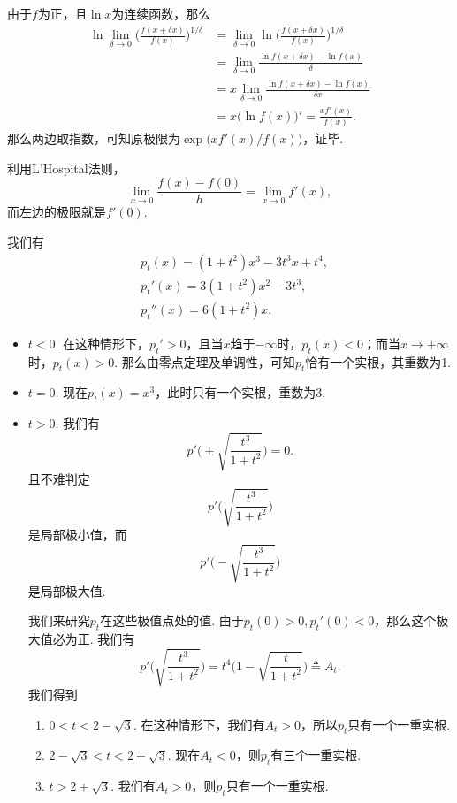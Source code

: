 \begin{ans}
  由于$f$为正，且$\ln x$为连续函数，那么
  \begin{align*}
    \ln\lim_{\delta\to0}\Big( \frac{f(x+\delta x)}{f(x)} \Big)^{1/\delta} & = \lim_{\delta\to0}\ln
    \Big( \frac{f(x+\delta x)}{f(x)} \Big)^{1/\delta}\\
    & = \lim_{\delta\to0}\frac{\ln f(x+\delta x)-\ln f(x)}
       \delta\\
    & = x \lim_{\delta\to0}\frac{\ln f(x+\delta x)-\ln f(x)}
       {\delta x}\\
    & = x \big(\ln f(x) \big)'=\frac{xf'(x)}{f(x)}.
  \end{align*}
  那么两边取指数，可知原极限为$\exp\big( xf'(x)/f(x) \big)$，证毕.
\end{ans}

\begin{ans}
   利用L'Hospital法则，
   \[
     \lim_{x\to0} \frac{f(x)-f(0)}h=\lim_{x\to0}f'(x),
   \]
   而左边的极限就是$f'(0)$.
\end{ans}

\begin{ans}
  我们有
  \begin{align*}
    & p_t(x) = (1+t^2)x^3-3t^3x+t^4,\\
    & p_t'(x) = 3(1+t^2)x^2-3t^3,\\
    & p_t''(x) = 6(1+t^2)x.
  \end{align*}
  \begin{itemize}\parindent=2em
    \item $t<0$. 在这种情形下，$p_t'>0$，且当$x$趋于$-\infty$时，$p_t(x)<0$；而当$x\to+\infty$时，$p_t(x)>0$. 那么由零点定理及单调性，可知$p_t$恰有一个实根，其重数为1.
    \item $t=0$. 现在$p_t(x)=x^3$，此时只有一个实根，重数为3.
    \item $t>0$. 我们有
    \[
      p'\Bigg( \pm\sqrt{\frac{t^3}{1+t^2}} \Bigg) = 0.
    \]
    且不难判定
    \[
      p'\Bigg( \sqrt{\frac{t^3}{1+t^2}} \Bigg)
    \]
    是局部极小值，而
    \[
      p'\Bigg( -\sqrt{\frac{t^3}{1+t^2}} \Bigg)
    \]
    是局部极大值.

    我们来研究$p_t$在这些极值点处的值. 由于$p_t(0)>0,p_t'(0)<0$，那么这个极大值必为正. 我们有
    \[
      p'\Bigg( \sqrt{\frac{t^3}{1+t^2}} \Bigg) =
      t^4\bigg( 1-\sqrt{\frac t{1+t^2}}\bigg) \triangleq A_t.
    \]
    我们得到
    \begin{enumerate}[label=(\arabic*)]
      \item $0<t<2-\sqrt3$. 在这种情形下，我们有$A_t>0$，所以$p_t$只有一个一重实根.
      \item $2-\sqrt3<t<2+\sqrt3$. 现在$A_t<0$，则$p_t$有三个一重实根.
      \item $t>2+\sqrt3$. 我们有$A_t>0$，则$p_t$只有一个一重实根.
    \end{enumerate}
  \end{itemize}
\end{ans}

